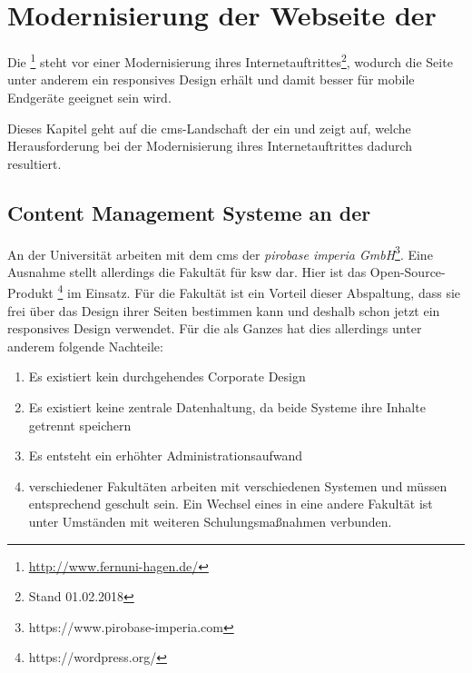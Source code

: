     \section{Modernisierung der Webseite der \fernUni}
        \label{chapter:FernUniRelaunch}
        Die \fernUni\footnote{\url{http://www.fernuni-hagen.de/}}
        steht vor einer Modernisierung ihres Internetauftrittes\footnote{Stand 01.02.2018},
        wodurch die Seite unter anderem ein responsives Design erhält und damit besser für
        mobile Endgeräte geeignet sein wird.

        Dieses Kapitel geht auf die \gls{cms}-Landschaft der {\fernUni} ein und zeigt auf,
        welche Herausforderung bei der Modernisierung ihres Internetauftrittes dadurch resultiert. 

        \subsection{Content Management Systeme an der \fernUni}
            \label{section:fernUniCMS}
            An der Universität arbeiten {\editors} mit dem \gls{cms} \textit{\imperia}
            der \textit{pirobase imperia GmbH}\footnote{https://www.pirobase-imperia.com}.
            Eine Ausnahme stellt allerdings die Fakultät für \gls{ksw} dar.
            Hier ist das Open-Source-Produkt \textit{\wordpress}\footnote{https://wordpress.org/} im Einsatz.
            Für die Fakultät ist ein Vorteil dieser Abspaltung,
            dass sie frei über das Design ihrer Seiten bestimmen kann
            und deshalb schon jetzt ein responsives Design verwendet.
            Für die {\fernUni} als Ganzes hat dies allerdings unter anderem folgende Nachteile:

            \begin{enumerate}
                \item   Es existiert kein durchgehendes Corporate Design
                \item   Es existiert keine zentrale Datenhaltung, da beide Systeme ihre Inhalte getrennt speichern
                \item   Es entsteht ein erhöhter Administrationsaufwand
                \item   {\editors} verschiedener Fakultäten arbeiten mit verschiedenen Systemen und müssen entsprechend geschult sein.
                        Ein Wechsel eines {\editors} in eine andere Fakultät ist unter Umständen mit weiteren Schulungsmaßnahmen verbunden.
            \end{enumerate}

